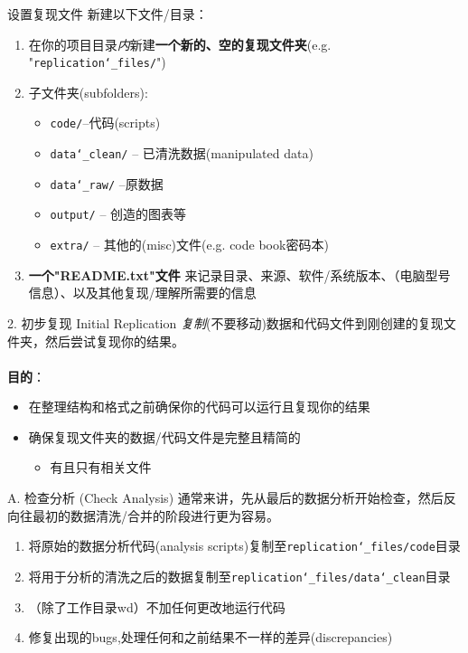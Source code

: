 \documentclass{beamer}
\begin{document}
\begin{frame}{设置复现文件}
新建以下文件/目录：
\begin{enumerate}
    \item 在你的项目目录\textit{内}新建\textbf{一个新的、空的复现文件夹}(e.g. "\texttt{replication\char`_files/}")
    \item 子文件夹(subfolders):
    \begin{itemize}
        \item \texttt{code/}--代码(scripts)
        \item \texttt{data\char`_clean/} -- 已清洗数据(manipulated data)
        \item \texttt{data\char`_raw/} --原数据
        \item \texttt{output/} -- 创造的图表等
        \item \texttt{extra/} -- 其他的(misc)文件(e.g. code book密码本)
    \end{itemize}
    \item \textbf{一个"README.txt"文件} 来记录目录、来源、软件/系统版本、（电脑型号信息）、以及其他复现/理解所需要的信息
\end{enumerate}
\end{frame}

\begin{frame}{2. 初步复现 Initial Replication}
\label{ini.rep}
\textit{复制}(不要移动)数据和代码文件到刚创建的复现文件夹，然后\alert{尝试复现你的结果}。\\
~\\
\textbf{目的}：
\begin{itemize}
    \item 在整理结构和格式之前确保你的代码可以运行且\alert{复现}你的结果
    \item 确保复现文件夹的数据/代码文件是\alert{完整且精简的}
    \begin{itemize}
        \item 有且只有相关文件
    \end{itemize}
\end{itemize}
\end{frame}

\begin{frame}{A. 检查分析 (Check Analysis)}
通常来讲，先从最后的数据分析开始检查，然后反向往最初的数据清洗/合并的阶段进行更为容易。
\begin{enumerate}
    \item 将原始的数据分析代码(analysis scripts)复制至\texttt{replication\char`_files/code}目录
    \item 将用于分析的清洗之后的数据复制至\texttt{replication\char`_files/data\char`_clean}目录
    \item （除了工作目录wd）不加任何更改地运行代码
    \item 修复出现的bugs,处理任何和之前结果不一样的差异(discrepancies)
\end{enumerate}
\end{frame}
\end{document}
